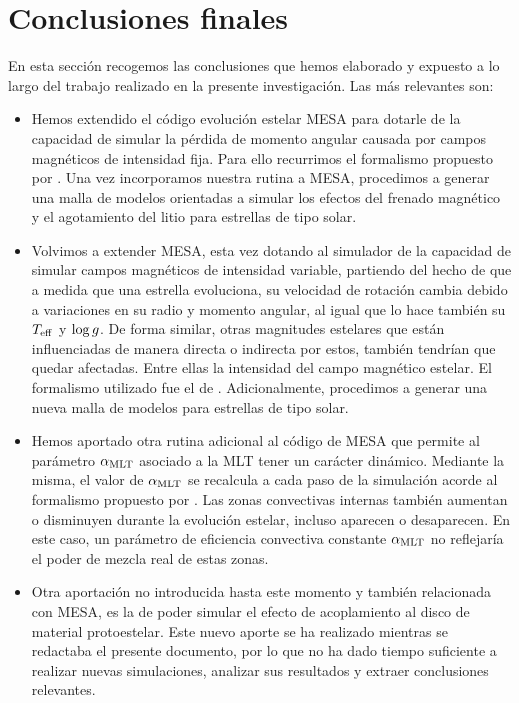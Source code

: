 \section{Conclusiones finales} \label{sec_conclusions}
En esta sección recogemos las conclusiones que hemos elaborado y expuesto a lo largo del trabajo realizado en la presente investigación. Las más relevantes son:
\begin{itemize}
    \item Hemos extendido el código evolución estelar MESA para dotarle de la capacidad de simular la pérdida de momento angular causada por campos magnéticos de intensidad fija. Para ello recurrimos el formalismo propuesto por \cite{Ud-Doula2007}. Una vez incorporamos nuestra rutina a MESA, procedimos a generar una malla de modelos orientadas a simular los efectos del frenado magnético y el agotamiento del litio para estrellas de tipo solar.
    \item Volvimos a extender MESA, esta vez dotando al simulador de la capacidad de simular campos magnéticos de intensidad variable, partiendo del hecho de que a medida que una estrella evoluciona, su velocidad de rotación cambia debido a variaciones en su radio y momento angular, al igual que lo hace también su $T_{\mathrm{eff}}$ y $\mathrm{log} \, g$. De forma similar, otras magnitudes estelares que están influenciadas de manera directa o indirecta por estos, también tendrían que quedar afectadas. Entre ellas la intensidad del campo magnético estelar. El formalismo utilizado fue el de \cite{Gallet2013}. Adicionalmente, procedimos a generar una nueva malla de modelos para estrellas de tipo solar.
    \item Hemos aportado otra rutina adicional al código de MESA que permite al parámetro $\alpha_{\mathrm{MLT}}$ asociado a la MLT tener un carácter dinámico. Mediante la misma, el valor de $\alpha_{\mathrm{MLT}}$ se recalcula a cada paso de la simulación acorde al formalismo propuesto por \cite{Sonoi2018}. Las zonas convectivas internas también aumentan o disminuyen durante la evolución estelar, incluso aparecen o desaparecen. En este caso, un parámetro de eficiencia convectiva constante $\alpha_{\mathrm{MLT}}$ no reflejaría el poder de mezcla real de estas zonas.
    \item Otra aportación no introducida hasta este momento y también relacionada con MESA, es la de poder simular el efecto de acoplamiento al disco de material protoestelar. Este nuevo aporte se ha realizado mientras se redactaba el presente documento, por lo que no ha dado tiempo suficiente a realizar nuevas simulaciones, analizar sus resultados y extraer conclusiones relevantes.

\end{itemize}
